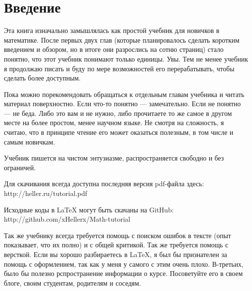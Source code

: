 \chapter*{Введение}

Эта книга изначально замышлялась как простой учебник для новичков в математике. После первых двух глав (которые планировалось сделать коротким введением и обзором, но в итоге они разрослись на сотню страниц) стало понятно, что этот учебник понимают только единицы. Увы. Тем не менее учебник я продолжаю писать и буду по мере возможностей его перерабатывать, чтобы сделать более доступным.

Пока можно порекомендовать обращаться к отдельным главам учебника и читать материал поверхностно. Если что-то понятно --- замечательно. Если не понятно --- не беда. Либо это вам и не нужно, либо прочитаете то же самое в другом месте на более простом, менее научном языке. Не смотря на сложность, я считаю, что в принципе чтение его может оказаться полезным, в том числе и самым новичкам.

Учебник пишется на чистом энтузиазме, распространяется свободно и без ограничей.

Для скачивания всегда доступна последняя версия pdf-файла здесь: http://heller.ru/tutorial.pdf

Исходные коды в LaTeX могут быть скачаны на GitHub:
http://github.com/xHellerx/Math-tutorial

Так же учебнику всегда требуется помощь с поиском ошибок в тексте (опыт показывает, что их полно) и с общей критикой. Так же требуется помощь с версткой. Если вы хорошо разбираетесь в \LaTeX, я был бы признателен за помощь с оформлением, так как у меня у самого с этим очень плохо. В-третьих, было бы полезно рспространение информации о курсе. Посоветуйте его в своем блоге, своим студентам, родителям и соседям.
